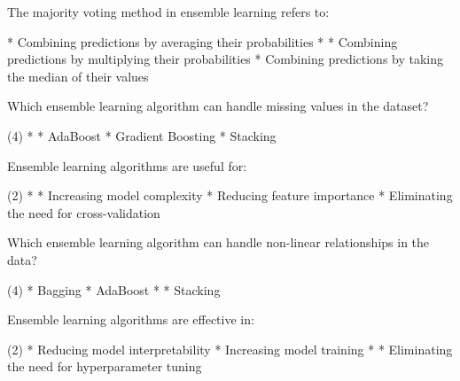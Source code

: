 \documentclass[10pt]{extarticle}
\begin{document}
\begin{exercise}
    The majority voting method in ensemble learning refers to:
    \begin{choice}
        * Combining predictions by averaging their probabilities
        * 
        * Combining predictions by multiplying their probabilities
        * Combining predictions by taking the median of their values
    \end{choice}
\end{exercise}
\begin{solution}
\end{solution}

\begin{exercise}
    Which ensemble learning algorithm can handle missing values in the dataset?
    \begin{choice} (4)
        * 
        * AdaBoost
        * Gradient Boosting
        * Stacking
    \end{choice}
\end{exercise}
\begin{solution}
\end{solution}

\begin{exercise}
    Ensemble learning algorithms are useful for:
    \begin{choice} (2)
        * 
        * Increasing model complexity
        * Reducing feature importance
        * Eliminating the need for cross-validation
    \end{choice}
\end{exercise}
\begin{solution}
\end{solution}

\begin{exercise}
    Which ensemble learning algorithm can handle non-linear relationships in the data?
    \begin{choice} (4)
        * Bagging
        * AdaBoost
        * 
        * Stacking
    \end{choice}
\end{exercise}
\begin{solution}
\end{solution}

\begin{exercise}
    Ensemble learning algorithms are effective in:
    \begin{choice} (2)
        * Reducing model interpretability
        * Increasing model training
        * 
        * Eliminating the need for hyperparameter tuning
    \end{choice}
\end{exercise}
\begin{solution}
\end{solution}
\end{document}
